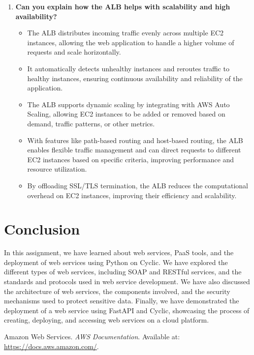 \documentclass[11pt]{article}
\begin{document}
\begin{enumerate}
    \item \textbf{Can you explain how the ALB helps with scalability and high availability?}
          \begin{itemize}
              \item The ALB distributes incoming traffic evenly across multiple EC2 instances, allowing the web application to handle a higher volume of requests and scale horizontally.
              \item It automatically detects unhealthy instances and reroutes traffic to healthy instances, ensuring continuous availability and reliability of the application.
              \item The ALB supports dynamic scaling by integrating with AWS Auto Scaling, allowing EC2 instances to be added or removed based on demand, traffic patterns, or other metrics.
              \item With features like path-based routing and host-based routing, the ALB enables flexible traffic management and can direct requests to different EC2 instances based on specific criteria, improving performance and resource utilization.
              \item By offloading SSL/TLS termination, the ALB reduces the computational overhead on EC2 instances, improving their efficiency and scalability.
          \end{itemize}
\end{enumerate}


\section{Conclusion}

In this assignment, we have learned about web services, PaaS tools, and the deployment of web services using Python on Cyclic. We have explored the different types of web services, including SOAP and RESTful services, and the standards and protocols used in web service development. We have also discussed the architecture of web services, the components involved, and the security mechanisms used to protect sensitive data. Finally, we have demonstrated the deployment of a web service using FastAPI and Cyclic, showcasing the process of creating, deploying, and accessing web services on a cloud platform.
\clearpage

\pagebreak
\begin{thebibliography}{}
    Amazon Web Services. \textit{AWS Documentation}. Available at: \url{https://docs.aws.amazon.com/}.
\end{thebibliography}
\end{document}
